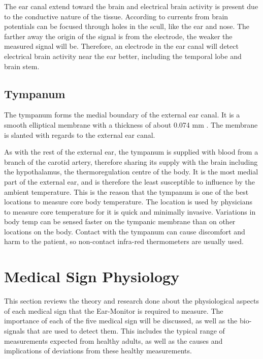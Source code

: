 \medskip

The ear canal extend toward the brain and electrical brain activity is present due to the conductive nature of the tissue. According to \cite{nunez2006electric} currents from brain potentials can be focused through holes in the scull, like the ear and nose. The farther away the origin of the signal is from the electrode, the weaker the measured signal will be. Therefore, an electrode in the ear canal will detect electrical brain activity near the ear better, including the temporal lobe and brain stem.

\subsection{Tympanum}
The tympanum forms the medial boundary of the external ear canal. It is a smooth elliptical membrane with a thickness of about 0.074 mm \citep{alvord1997anatomy}. The membrane is slanted with regards to the external ear canal.

\medskip

As with the rest of the external ear, the tympanum is supplied with blood from a branch of the carotid artery, therefore sharing its supply with the brain including the hypothalamus, the thermoregulation centre of the body. It is the most medial part of the external ear, and is therefore the least susceptible to influence by the ambient temperature. This is the reason that the tympanum is one of the best locations to measure core body temperature. The location is used by physicians to measure core temperature for it is quick and minimally invasive. Variations in body temp can be sensed faster on the tympanic membrane than on other locations on the body. Contact with the tympanum can cause discomfort and harm to the patient, so non-contact infra-red thermometers are usually used.


\section{Medical Sign Physiology} %
This section reviews the theory and research done about the physiological aspects of each medical sign that the Ear-Monitor is required to measure. The importance of each of the five medical sign will be discussed, as well as the bio-signals that are used to detect them. This includes the typical range of measurements expected from healthy adults, as well as the causes and implications of deviations from these healthy measurements.

